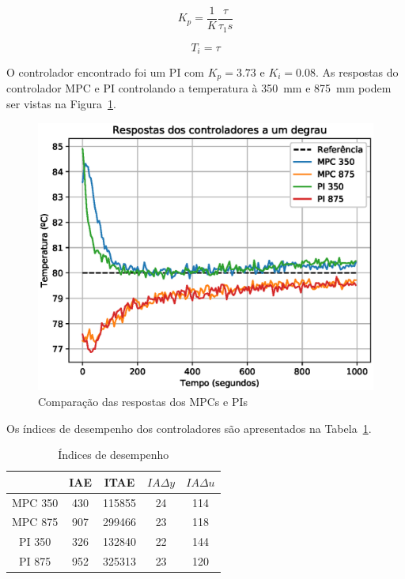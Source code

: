 \begin{equation}
	\label{eq:pi-ds-gain}
	K_p = \frac{1}{K}\frac{\tau}{\tau_{1}s}
\end{equation}

\begin{equation}
	\label{eq:pi-ds-ti}
	T_i = \tau
\end{equation}

O controlador encontrado foi um PI com \(K_p=3.73\) e \(K_i=0.08\). As respostas
do controlador MPC e PI controlando a temperatura à \SI{350}{\milli\metre} e
\SI{875}{\milli\metre} podem ser vistas na Figura~\ref{fig:comparacao}.

\begin{figure}[ht!]
	\centering
	\captionsetup{justification=centering}
	\includegraphics[height=0.5\linewidth]{imgs/comparacao}
	\caption{Comparação das respostas dos MPCs e PIs}%
	\label{fig:comparacao}
\end{figure}

Os índices de desempenho dos controladores são apresentados na
Tabela~\ref{tbl:indexes}.

\begin{table}[ht!]
	\centering
	\caption{Índices de desempenho}%
	\label{tbl:indexes}
	\begin{tabular}{ccccc}
		        & IAE & ITAE   & \(IA\Delta{}y\) & \(IA\Delta{}u\) \\ \midrule
		MPC 350 & 430 & 115855 & 24              & 114             \\ \midrule
		MPC 875 & 907 & 299466 & 23              & 118             \\ \midrule
		PI 350  & 326 & 132840 & 22              & 144             \\ \midrule
		PI 875  & 952 & 325313 & 23              & 120
	\end{tabular}
\end{table}

